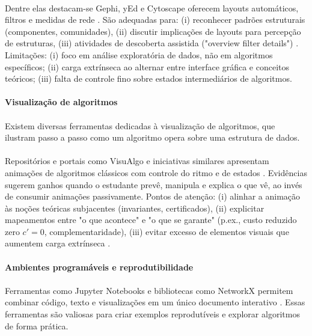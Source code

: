 \documentclass[12pt,a4paper]{article}
\begin{document}
\paragraph{}
Dentre elas destacam-se Gephi, yEd e Cytoscape oferecem layouts automáticos, filtros e medidas de rede \cite{bastian2009gephi,yed,shannon2003cytoscape}. São adequadas para: (i) reconhecer padrões estruturais (componentes, comunidades), (ii) discutir implicações de layouts para percepção de estruturas, (iii) atividades de descoberta assistida ("overview \textrightarrow{} filter \textrightarrow{} details") \cite{shneiderman1996eyes}. Limitações: (i) foco em análise exploratória de dados, não em algoritmos específicos; (ii) carga extrínseca ao alternar entre interface gráfica e conceitos teóricos; (iii) falta de controle fino sobre estados intermediários de algoritmos.

\paragraph{Visualização de algoritmos}
\paragraph{}
Existem diversas ferramentas dedicadas à visualização de algoritmos, que ilustram passo a passo como um algoritmo opera sobre uma estrutura de dados. 

\paragraph{}
Repositórios e portais como VisuAlgo e iniciativas similares apresentam animações de algoritmos clássicos com controle do ritmo e de estados \cite{visualgo,hundhausen2002meta,naps2003engagement}. Evidências sugerem ganhos quando o estudante prevê, manipula e explica o que vê, ao invés de consumir animações passivamente. Pontos de atenção: (i) alinhar a animação às noções teóricas subjacentes (invariantes, certificados), (ii) explicitar mapeamentos entre "o que acontece" e "o que se garante" (p.ex., custo reduzido zero \(c'=0\), complementaridade), (iii) evitar excesso de elementos visuais que aumentem carga extrínseca \cite{mayer2009multimedia}.

\paragraph{Ambientes programáveis e reprodutibilidade}
\paragraph{}
Ferramentas como Jupyter Notebooks e bibliotecas como NetworkX permitem combinar código, texto e visualizações em um único documento interativo \cite{kluyver2016jupyter,hagberg2008networkx}. Essas ferramentas são valiosas para criar exemplos reprodutíveis e explorar algoritmos de forma prática.
\end{document}
